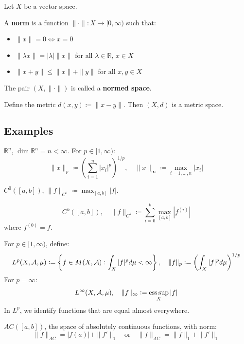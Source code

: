Let \( X \) be a vector space.

A \textbf{norm} is a function \( \|\cdot\| : X \to [0, \infty) \) such that:
\begin{itemize}
    \item \( \|x\| = 0 \iff x = 0 \)
    \item \( \|\lambda x\| = |\lambda| \|x\| \) for all \( \lambda \in \mathbb{R} \), \( x \in X \)
    \item \( \|x + y\| \leq \|x\| + \|y\| \) for all \( x, y \in X \)
\end{itemize}

The pair \( (X, \|\cdot\|) \) is called a \textbf{normed space}.

Define the metric \( d(x, y) \coloneqq \|x - y\| \). Then \( (X, d) \) is a metric space.

\subsection{Examples}

\begin{example}
\( \mathbb{R}^n \), \( \dim \mathbb{R}^n = n < \infty \). For \( p \in [1, \infty) \):
\[
\|x\|_p \coloneqq \left( \sum_{i=1}^{n} |x_i|^p \right)^{1/p}, \quad \|x\|_\infty \coloneqq \max_{i=1,\dots,n} |x_i|
\]
\end{example}

\begin{example}
\( C^0([a,b]) \), \( \|f\|_{C^0} \coloneqq \max_{[a,b]} |f| \).

\[
C^k([a,b]), \quad \|f\|_{C^k} \coloneqq \sum_{i=0}^{k} \max_{[a,b]} |f^{(i)}|
\]
where \( f^{(0)} = f \).
\end{example}

\begin{example}
For \( p \in [1, \infty) \), define:
\[
L^p(X, \mathcal{A}, \mu) \mathrel{\mathop:}= \left\{ f \in M(X, \mathcal{A}) : \int_X |f|^p  d\mu < \infty \right\}, \quad \|f\|_p \mathrel{\mathop:}= \left( \int_X |f|^p  d\mu \right)^{1/p}
\]
For \( p = \infty \):
\[
L^\infty(X, \mathcal{A}, \mu), \quad \|f\|_\infty \mathrel{\mathop:}= \operatorname*{ess\,sup}_X |f|
\]
In \( L^p \), we identify functions that are equal almost everywhere.
\end{example}

\begin{example}
\( AC([a,b]) \), the space of absolutely continuous functions, with norm:
\[
\|f\|_{AC} = |f(a)| + \|f'\|_1 \quad \text{or} \quad \|f\|_{AC} = \|f\|_1 + \|f'\|_1
\]
\end{example}

